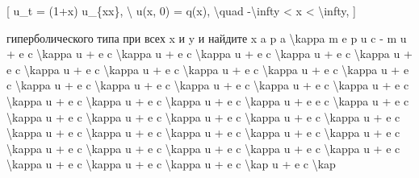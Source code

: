 \documentclass[
]{article}
\begin{document}
{[} u\_t = (1+x) u\_\{xx\}, \textbackslash{} u(x, 0) = q(x),
\textbackslash quad -\textbackslash infty \textless{} x \textless{}
\textbackslash infty, {]}

гиперболического типа при всех x и y и найдите x a p a
\textbackslash kappa m e p u c - m u + e c \textbackslash kappa u + e c
\textbackslash kappa u + e c \textbackslash kappa u + e c
\textbackslash kappa u + e c \textbackslash kappa u + e c
\textbackslash kappa u + e c \textbackslash kappa u + e c
\textbackslash kappa u + e c \textbackslash kappa u + e c
\textbackslash kappa u + e c \textbackslash kappa u + e c
\textbackslash kappa u + e c \textbackslash kappa u + e c
\textbackslash kappa u + e c \textbackslash kappa u + e c
\textbackslash kappa u + e c \textbackslash kappa u + e c
\textbackslash kappa u + e c \textbackslash kappa u + e e c
\textbackslash kappa u + e c \textbackslash kappa u + e c
\textbackslash kappa u + e c \textbackslash kappa u + e c
\textbackslash kappa u + e c \textbackslash kappa u + e c
\textbackslash kappa u + e c \textbackslash kappa u + e c
\textbackslash kappa u + e c \textbackslash kappa u + e c
\textbackslash kappa u + e c \textbackslash kappa u + e c
\textbackslash kappa u + e c \textbackslash kappa u + e c
\textbackslash kappa u + e c \textbackslash kappa u + e c
\textbackslash kappa u + e c \textbackslash kappa u + e c
\textbackslash kappa u + e c \textbackslash kap u + e c
\textbackslash kap
\end{document}
